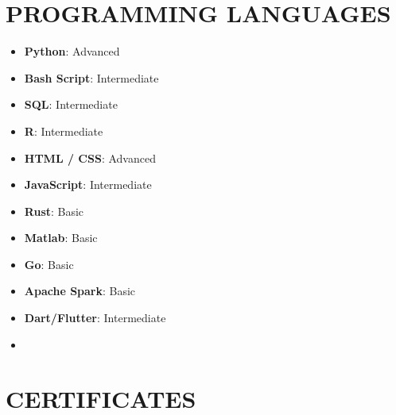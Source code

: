 \documentclass[11 pt,oneside,a4paper,titlepage]{article}
\begin{document}
{\begin{minipage}{11.3cm}

    \vspace*{0.22cm}

    
    \section*{\textcolor{mitred}{{\faCode} PROGRAMMING LANGUAGES}}
    \vspace*{-0.5cm}
    \begin{multicols}{2}    
    \begin{itemize}
    \footnotesize
        \item \textbf{Python}: Advanced
        \item \textbf{Bash Script}: Intermediate
        \item \textbf{SQL}: Intermediate
        \item \textbf{R}: Intermediate 
        \item \textbf{HTML / CSS}: Advanced
        \item \textbf{JavaScript}: Intermediate
        \item \textbf{Rust}: Basic
        \item \textbf{Matlab}: Basic
        \item \textbf{Go}: Basic
        \item \textbf{Apache Spark}: Basic
        \item \textbf{Dart/Flutter}: Intermediate 
        \item[\vspace{\fill}]
    \end{itemize}
    \end{multicols}
    
    \section*{\textcolor{mitred}{{\faCertificate} CERTIFICATES}}
    

\end{minipage}}
\end{document}
